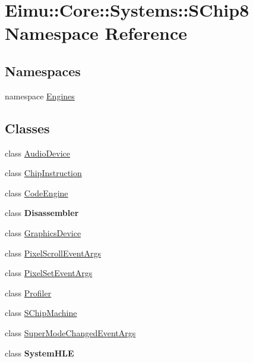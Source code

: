 \hypertarget{namespace_eimu_1_1_core_1_1_systems_1_1_s_chip8}{
\section{Eimu::Core::Systems::SChip8 Namespace Reference}
\label{namespace_eimu_1_1_core_1_1_systems_1_1_s_chip8}
}
\subsection*{Namespaces}
\begin{DoxyCompactItemize}
\item 
namespace \hyperlink{namespace_eimu_1_1_core_1_1_systems_1_1_s_chip8_1_1_engines}{Engines}
\end{DoxyCompactItemize}
\subsection*{Classes}
\begin{DoxyCompactItemize}
\item 
class \hyperlink{class_eimu_1_1_core_1_1_systems_1_1_s_chip8_1_1_audio_device}{AudioDevice}
\item 
class \hyperlink{class_eimu_1_1_core_1_1_systems_1_1_s_chip8_1_1_chip_instruction}{ChipInstruction}
\item 
class \hyperlink{class_eimu_1_1_core_1_1_systems_1_1_s_chip8_1_1_code_engine}{CodeEngine}
\item 
class {\bfseries Disassembler}
\item 
class \hyperlink{class_eimu_1_1_core_1_1_systems_1_1_s_chip8_1_1_graphics_device}{GraphicsDevice}
\item 
class \hyperlink{class_eimu_1_1_core_1_1_systems_1_1_s_chip8_1_1_pixel_scroll_event_args}{PixelScrollEventArgs}
\item 
class \hyperlink{class_eimu_1_1_core_1_1_systems_1_1_s_chip8_1_1_pixel_set_event_args}{PixelSetEventArgs}
\item 
class \hyperlink{class_eimu_1_1_core_1_1_systems_1_1_s_chip8_1_1_profiler}{Profiler}
\item 
class \hyperlink{class_eimu_1_1_core_1_1_systems_1_1_s_chip8_1_1_s_chip_machine}{SChipMachine}
\item 
class \hyperlink{class_eimu_1_1_core_1_1_systems_1_1_s_chip8_1_1_super_mode_changed_event_args}{SuperModeChangedEventArgs}
\item 
class {\bfseries SystemHLE}
\end{DoxyCompactItemize}
